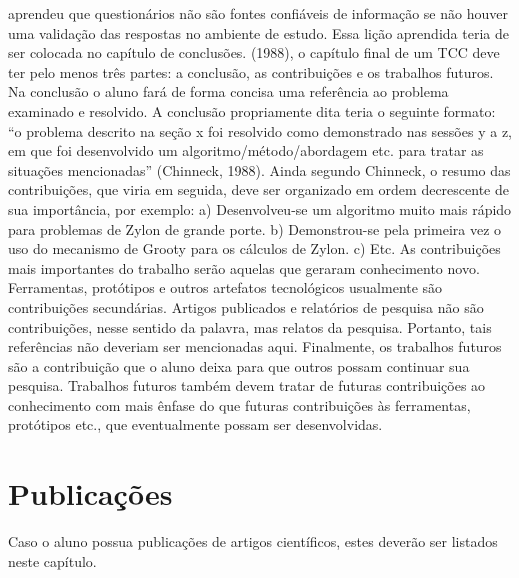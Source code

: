 \documentclass[
	12pt,				%
    oneside,			%
	a4paper,			%
	english,			%
	french,				%
	spanish,			%
	brazil,				%
	]{abntex2}
\begin{document}
aprendeu que questionários não são fontes confiáveis de informação se não houver uma validação das
respostas no ambiente de estudo. Essa lição aprendida teria de ser colocada no capítulo de conclusões.
(1988), o capítulo final de um TCC deve ter pelo menos três partes: a conclusão, as contribuições e os
trabalhos futuros.
Na conclusão o aluno fará de forma concisa uma referência ao problema examinado e resolvido. A conclusão
propriamente dita teria o seguinte formato: “o problema descrito na seção x foi resolvido como demonstrado
nas sessões y a z, em que foi desenvolvido um algoritmo/método/abordagem etc. para tratar as situações
mencionadas” (Chinneck, 1988).
Ainda segundo Chinneck, o resumo das contribuições, que viria em seguida, deve ser organizado em ordem
decrescente de sua importância, por exemplo:
a) Desenvolveu-se um algoritmo muito mais rápido para problemas de Zylon de grande porte.
b) Demonstrou-se pela primeira vez o uso do mecanismo de Grooty para os cálculos de Zylon.
c) Etc.
As contribuições mais importantes do trabalho serão aquelas que geraram conhecimento novo. Ferramentas,
protótipos e outros artefatos tecnológicos usualmente são contribuições secundárias.
Artigos publicados e relatórios de pesquisa não são contribuições, nesse sentido da palavra, mas relatos da
pesquisa. Portanto, tais referências não deveriam ser mencionadas aqui.
Finalmente, os trabalhos futuros são a contribuição que o aluno deixa para que outros possam continuar sua
pesquisa. Trabalhos futuros também devem tratar de futuras contribuições ao conhecimento com mais ênfase
do que futuras contribuições às ferramentas, protótipos etc., que eventualmente possam ser desenvolvidas.


\chapter{Publicações}
Caso o aluno possua publicações de artigos científicos, estes deverão ser listados neste capítulo.

\postextual



%
%
\end{document}
